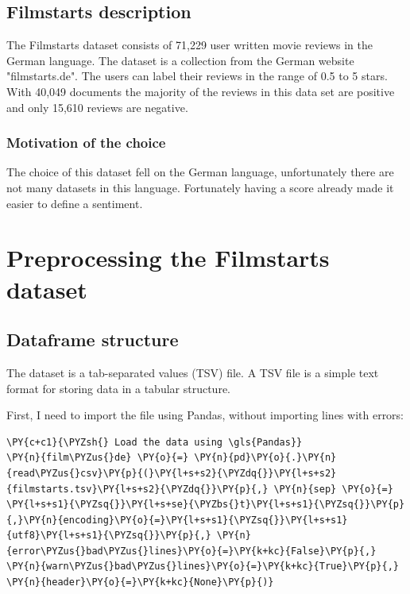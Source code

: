 \subsection{Filmstarts description}
The Filmstarts dataset \cite{guhr_oliverguhrgerman-sentiment_2021} consists of 71,229 user written movie reviews in the German language. The dataset is a collection from the German website "filmstarts.de". The users can label their reviews in the range of 0.5 to 5 stars. With 40,049 documents the majority of the reviews in this data set are positive and only 15,610 reviews are negative.

\subsubsection*{Motivation of the choice}
The choice of this dataset fell on the German language, unfortunately there are not many datasets in this language. Fortunately having a score already made it easier to define a sentiment.

\section{Preprocessing the Filmstarts dataset}
\label{chap:work on dataset}
\subsection{Dataframe structure}
The dataset is a tab-separated values (TSV) file. A TSV file is a simple text format for storing data in a tabular structure.

First, I need to import the file using \gls{Pandas}, without importing lines with errors:

    \begin{tcolorbox}[breakable, size=fbox, boxrule=1pt, pad at break*=1mm,colback=cellbackground, colframe=cellborder]
\begin{Verbatim}[commandchars=\\\{\},fontsize=\footnotesize]
\PY{c+c1}{\PYZsh{} Load the data using \gls{Pandas}}
\PY{n}{film\PYZus{}de} \PY{o}{=} \PY{n}{pd}\PY{o}{.}\PY{n}{read\PYZus{}csv}\PY{p}{(}\PY{l+s+s2}{\PYZdq{}}\PY{l+s+s2}{filmstarts.tsv}\PY{l+s+s2}{\PYZdq{}}\PY{p}{,} \PY{n}{sep} \PY{o}{=} \PY{l+s+s1}{\PYZsq{}}\PY{l+s+se}{\PYZbs{}t}\PY{l+s+s1}{\PYZsq{}}\PY{p}{,}\PY{n}{encoding}\PY{o}{=}\PY{l+s+s1}{\PYZsq{}}\PY{l+s+s1}{utf8}\PY{l+s+s1}{\PYZsq{}}\PY{p}{,} \PY{n}{error\PYZus{}bad\PYZus{}lines}\PY{o}{=}\PY{k+kc}{False}\PY{p}{,} \PY{n}{warn\PYZus{}bad\PYZus{}lines}\PY{o}{=}\PY{k+kc}{True}\PY{p}{,} \PY{n}{header}\PY{o}{=}\PY{k+kc}{None}\PY{p}{)}
\end{Verbatim}
\end{tcolorbox}

